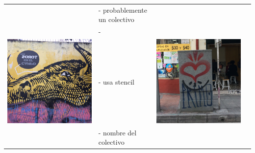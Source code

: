 \documentclass[11pt]{article}
\begin{document}
\begin{center}
\begin{tabular}{llll}
 & - probablemente un colectivo &  & \\
 & - &  & \\
\hline
\includegraphics[width=.9\linewidth]{./graffitti/toro.JPG} & - usa stencil & \includegraphics[width=.9\linewidth]{./graffitti/gffti2.JPG} & \\
 & - nombre del colectivo &  & \\
\hline

\end{tabular}
\end{center}
\end{document}
